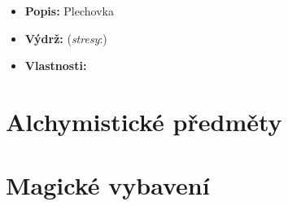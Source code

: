 \documentclass[../main.tex]{subfiles}
\begin{document}
\begin{predmet}
\begin{itemize}
	\item \textbf{Popis:} Plechovka
	\item \textbf{Výdrž:} (\emph{stresy}:) 
	\item \textbf{Vlastnosti:} 
\end{itemize}
\end{predmet}

\renewcommand*{\predmetlist}{predmety}%
\section{Alchymistické předměty}
\label{sec:alchymisticke-predmety}

\section{Magické vybavení}
\label{sec:magicke-vybaveni}
\end{document}
